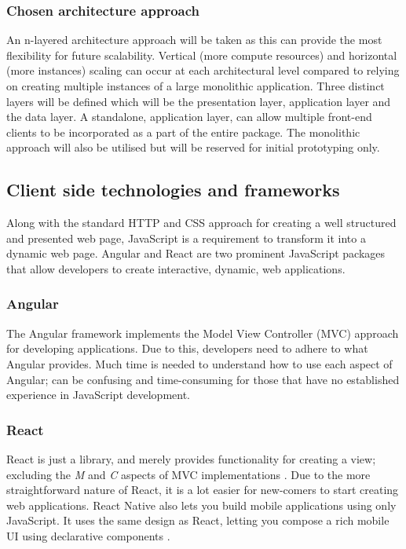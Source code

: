 \subsubsection*{Chosen architecture approach}
An n-layered architecture approach will be taken as this can provide the most flexibility for future scalability.
Vertical (more compute resources) and horizontal (more instances) scaling can occur at each architectural level compared to relying on
creating multiple instances of a large monolithic application.
Three distinct layers will be defined which will be the presentation layer, application layer and the data layer.
A standalone, application layer, can allow multiple front-end clients to be incorporated as a part of the entire package.
The monolithic approach will also be utilised but will be reserved for initial prototyping only.

\subsection{Client side technologies and frameworks}

Along with the standard HTTP and CSS approach for creating a well structured and presented web page, JavaScript is a requirement to
transform it into a dynamic web page.
Angular and React are two prominent JavaScript packages that allow developers to create interactive, dynamic, web applications.

\subsubsection*{Angular}
The Angular framework implements the Model View Controller (MVC) approach for developing applications.
Due to this, developers need to adhere to what Angular provides. 
Much time is needed to understand how to use each aspect of Angular; can be confusing and time-consuming for those that
have no established experience in JavaScript development.

\subsubsection*{React}
React is just a library, and merely provides functionality for creating a view; excluding the \textit{M} and \textit{C} aspects of
MVC implementations \cite{mosh2018reactvangular}.
Due to the more straightforward nature of React, it is a lot easier for new-comers to start creating web applications.
React Native also lets you build mobile applications using only JavaScript.
It uses the same design as React, letting you compose a rich mobile UI using declarative components \cite{facebook2019reactnative}.


